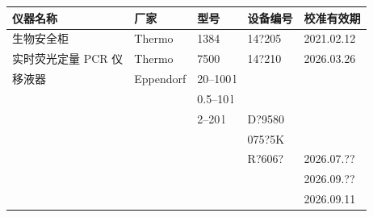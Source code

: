 \documentclass[UTF8,10pt,a4paper,fontset=fandol]{ctexart}
\newcommand{\fieldvalue}[1]{#1}
\newcommand{\handwritten}[1]{#1}
\begin{document}
\small
\begin{tabular}{|p{2.5cm}|p{2.0cm}|p{2.8cm}|p{2.8cm}|p{2.8cm}|}
\hline
仪器名称 & 厂家 & 型号 & 设备编号 & 校准有效期\\
\hline
\fieldvalue{生物安全柜} &
\fieldvalue{Thermo} &
\fieldvalue{1384} &
\fieldvalue{\handwritten{14?205}} &
\fieldvalue{\handwritten{2021.02.12}}\\
\hline
实时荧光定量 PCR 仪 &
\fieldvalue{Thermo} &
\fieldvalue{7500} &
\fieldvalue{\handwritten{14?210}} &
\fieldvalue{\handwritten{2026.03.26}}\\
\hline
移液器 &
\fieldvalue{Eppendorf} &
\fieldvalue{\handwritten{20--100\,\textmu l}}\\[-1mm]
&
&
\fieldvalue{\handwritten{0.5--10\,\textmu l}}\\[-1mm]
&
&
\fieldvalue{\handwritten{2--20\,\textmu l}} &
\fieldvalue{\handwritten{D?9580}}\\[-1mm]
&
&
&
\fieldvalue{\handwritten{075?5K}}\\[-1mm]
&
&
&
\fieldvalue{\handwritten{R?606?}} &
\fieldvalue{\handwritten{2026.07.??}}\\[-1mm]
&
&
&
&
\fieldvalue{\handwritten{2026.09.??}}\\[-1mm]
&
&
&
&
\fieldvalue{\handwritten{2026.09.11}}\\
\hline
\end{tabular}
\end{document}
